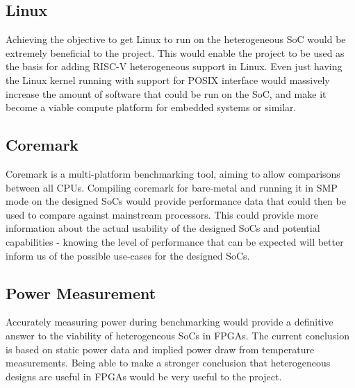 \subsection{Linux}
Achieving the objective to get Linux to run on the heterogeneous SoC would be extremely beneficial to the project. This would enable the project to be used as the basis for adding RISC-V heterogeneous support in Linux. Even just having the Linux kernel running with support for POSIX interface would massively increase the amount of software that could be run on the SoC, and make it become a viable compute platform for embedded systems or similar.

\subsection{Coremark}
Coremark\cite{coremark} is a multi-platform benchmarking tool, aiming to allow comparisons between all CPUs. Compiling coremark for bare-metal and running it in SMP mode on the designed SoCs would provide performance data that could then be used to compare against mainstream processors. This could provide more information about the actual usability of the designed SoCs and potential capabilities - knowing the level of performance that can be expected will better inform us of the possible use-cases for the designed SoCs.

\subsection{Power Measurement}
Accurately measuring power during benchmarking would provide a definitive answer to the viability of heterogeneous SoCs in FPGAs. The current conclusion is based on static power data and implied power draw from temperature measurements. Being able to make a stronger conclusion that heterogeneous designs are useful in FPGAs would be very useful to the project.